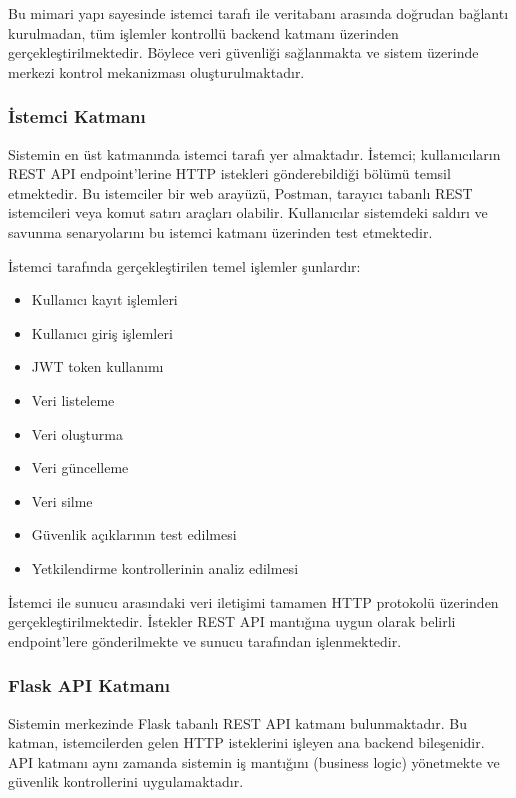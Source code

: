 Bu mimari yapı sayesinde istemci tarafı ile veritabanı arasında doğrudan bağlantı kurulmadan, tüm işlemler kontrollü backend katmanı üzerinden gerçekleştirilmektedir. Böylece veri güvenliği sağlanmakta ve sistem üzerinde merkezi kontrol mekanizması oluşturulmaktadır.

\subsubsection{İstemci Katmanı}

Sistemin en üst katmanında istemci tarafı yer almaktadır. İstemci; kullanıcıların REST API endpoint’lerine HTTP istekleri gönderebildiği bölümü temsil etmektedir. Bu istemciler bir web arayüzü, Postman, tarayıcı tabanlı REST istemcileri veya komut satırı araçları olabilir. Kullanıcılar sistemdeki saldırı ve savunma senaryolarını bu istemci katmanı üzerinden test etmektedir.

İstemci tarafında gerçekleştirilen temel işlemler şunlardır:

\begin{itemize}[leftmargin=*]
    \item Kullanıcı kayıt işlemleri
    \item Kullanıcı giriş işlemleri
    \item JWT token kullanımı
    \item Veri listeleme
    \item Veri oluşturma
    \item Veri güncelleme
    \item Veri silme
    \item Güvenlik açıklarının test edilmesi
    \item Yetkilendirme kontrollerinin analiz edilmesi
\end{itemize}

İstemci ile sunucu arasındaki veri iletişimi tamamen HTTP protokolü üzerinden gerçekleştirilmektedir. İstekler REST API mantığına uygun olarak belirli endpoint’lere gönderilmekte ve sunucu tarafından işlenmektedir.

\subsubsection{Flask API Katmanı}

Sistemin merkezinde Flask tabanlı REST API katmanı bulunmaktadır. Bu katman, istemcilerden gelen HTTP isteklerini işleyen ana backend bileşenidir. API katmanı aynı zamanda sistemin iş mantığını (business logic) yönetmekte ve güvenlik kontrollerini uygulamaktadır.

